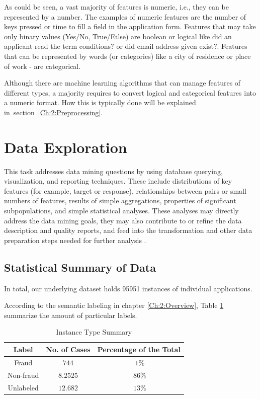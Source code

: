 As could be seen, a vast majority of features is numeric, i.e., they can be represented by a number. The examples of numeric features are the number of keys pressed or time to fill a field in the application form. Features that may take only binary values (Yes/No, True/False) are boolean or logical like did an applicant read the term conditions? or did email address given exist?. Features that can be represented by words (or categories) like a city of residence or place of work - are categorical.

Although there are machine learning algorithms that can manage features of different types, a majority requires to convert logical and categorical features into a numeric format. How this is typically done will be explained in~section~\ref{Ch:2:Preprocessing}.

\section{Data Exploration}\label{Ch:2:Exploration}
This task addresses data mining questions by using database querying, visualization, and reporting techniques. These include distributions of key features (for example, target or response), relationships between pairs or small numbers of features, results of simple aggregations, properties of significant subpopulations, and simple statistical analyses. These analyses may directly address the data mining goals, they may also contribute to or refine the data description and quality reports, and feed into the transformation and other data preparation steps needed for further analysis \cite{crisp}.

\subsection{Statistical Summary of Data}\label{Ch:2:SSummary}
In total, our underlying dataset holds 95951 instances of individual applications.

According to the semantic labeling in chapter \ref{Ch:2:Overview}, Table \ref{tab:instance-summary} summarize the amount of particular labels.

\begin{table}[h!]
  \begin{center}
    \caption{Instance Type Summary}
    \label{tab:instance-summary}
    \begin{tabular}{c|c|c}
    Label & No. of Cases & Percentage of the Total \\
      \hline
     Fraud & \(744\) & \(~1\%\) \\ 
     \hline
     Non-fraud & \(8.2525\) &  \(~86\%\) \\
     \hline
     Unlabeled & \(12.682\) &  \(~13\%\) \\
     \hline
    \end{tabular}
  \end{center}
\end{table}

